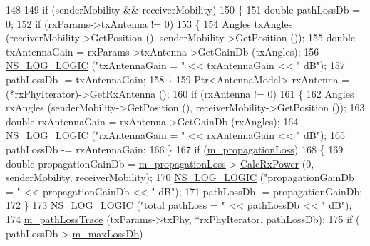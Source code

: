 \begin{DoxyCode}
148 
149           \textcolor{keywordflow}{if} (senderMobility && receiverMobility)
150             \{
151               \textcolor{keywordtype}{double} pathLossDb = 0;
152               \textcolor{keywordflow}{if} (rxParams->txAntenna != 0)
153                 \{
154                   Angles txAngles (receiverMobility->GetPosition (), senderMobility->GetPosition ());
155                   \textcolor{keywordtype}{double} txAntennaGain = rxParams->txAntenna->GetGainDb (txAngles);
156                   \hyperlink{group__logging_ga88acd260151caf2db9c0fc84997f45ce}{NS\_LOG\_LOGIC} (\textcolor{stringliteral}{"txAntennaGain = "} << txAntennaGain << \textcolor{stringliteral}{" dB"});
157                   pathLossDb -= txAntennaGain;
158                 \}
159               Ptr<AntennaModel> rxAntenna = (*rxPhyIterator)->GetRxAntenna ();
160               \textcolor{keywordflow}{if} (rxAntenna != 0)
161                 \{
162                   Angles rxAngles (senderMobility->GetPosition (), receiverMobility->GetPosition ());
163                   \textcolor{keywordtype}{double} rxAntennaGain = rxAntenna->GetGainDb (rxAngles);
164                   \hyperlink{group__logging_ga88acd260151caf2db9c0fc84997f45ce}{NS\_LOG\_LOGIC} (\textcolor{stringliteral}{"rxAntennaGain = "} << rxAntennaGain << \textcolor{stringliteral}{" dB"});
165                   pathLossDb -= rxAntennaGain;
166                 \}
167               \textcolor{keywordflow}{if} (\hyperlink{classns3_1_1SingleModelSpectrumChannel_a9a9d930ce79583ff7b1e4a73a551765d}{m\_propagationLoss})
168                 \{
169                   \textcolor{keywordtype}{double} propagationGainDb = \hyperlink{classns3_1_1SingleModelSpectrumChannel_a9a9d930ce79583ff7b1e4a73a551765d}{m\_propagationLoss}->
      \hyperlink{classns3_1_1PropagationLossModel_a8b42564e9b03e2197f17aab6692c4fee}{CalcRxPower} (0, senderMobility, receiverMobility);
170                   \hyperlink{group__logging_ga88acd260151caf2db9c0fc84997f45ce}{NS\_LOG\_LOGIC} (\textcolor{stringliteral}{"propagationGainDb = "} << propagationGainDb << \textcolor{stringliteral}{" dB"});
171                   pathLossDb -= propagationGainDb;
172                 \}                    
173               \hyperlink{group__logging_ga88acd260151caf2db9c0fc84997f45ce}{NS\_LOG\_LOGIC} (\textcolor{stringliteral}{"total pathLoss = "} << pathLossDb << \textcolor{stringliteral}{" dB"});    
174               \hyperlink{classns3_1_1SingleModelSpectrumChannel_ac20ae2c0f27bed879388820857b97599}{m\_pathLossTrace} (txParams->txPhy, *rxPhyIterator, pathLossDb);
175               \textcolor{keywordflow}{if} ( pathLossDb > \hyperlink{classns3_1_1SingleModelSpectrumChannel_a77e85736d9520060359b9d2f420c0747}{m\_maxLossDb})

\end{DoxyCode}
